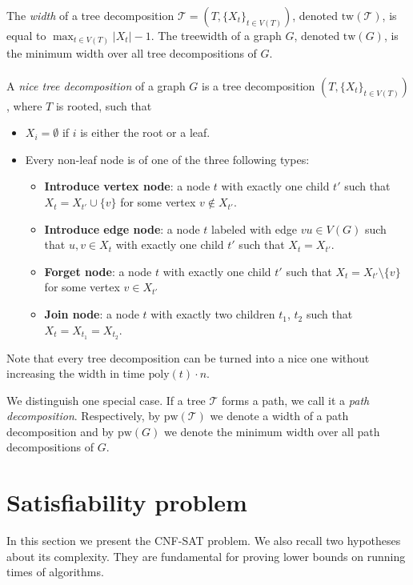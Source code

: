 \documentclass[en]{pracamgr}
\theoremstyle{definition}
\newcommand{\cnfsat}{{\sc CNF-SAT}}
\begin{document}
The \emph{width} of a tree decomposition $\mathcal{T} = (T,\{X_t\}_{t\in V(T)})$, denoted $\textrm{tw}(\mathcal{T})$, is equal to $\max_{t \in V(T)} |X_t| - 1$. The treewidth of a graph $G$, denoted $\textrm{tw}(G)$, is the minimum width over all tree decompositions of $G$.
\\\\
A \emph{nice tree decomposition} of a graph $G$ is a tree decomposition $(T, \{X_t\}_{t \in V(T)})$, where $T$ is rooted, such that
\begin{itemize}
	\item $X_i = \emptyset$ if $i$ is either the root or a leaf.
	\item Every non-leaf node is of one of the three following types:
	\begin{itemize}
		\item \textbf{Introduce vertex node}: a node $t$ with exactly one child $t'$ such that $X_t = X_{t'} \cup \{v\}$ for some vertex $v \notin X_{t'}$.
		\item \textbf{Introduce edge node}: a node $t$ labeled with edge $vu \in V(G)$ such that $u,v \in X_t$ with exactly one child $t'$ such that $X_t = X_{t'}$.
		\item \textbf{Forget node}: a node $t$ with exactly one child $t'$ such that $X_t = X_{t'} \setminus \{v\}$ for some vertex $v \in X_{t'}$
		\item \textbf{Join node}: a node $t$ with exactly two children $t_1$, $t_2$ such that $X_t = X_{t_1} = X_{t_2}$.
	\end{itemize}
\end{itemize}
Note that every tree decomposition can be turned into a nice one without increasing the width in time $\textrm{poly}(t) \cdot n$.

We distinguish one special case. If a tree $\mathcal{T}$ forms a path, we call it a \emph{path decomposition}. Respectively, by $\textrm{pw}(\mathcal{T})$ we denote a width of a path decomposition and by $\textrm{pw}(G)$ we denote the minimum width over all path decompositions of $G$.

\section{Satisfiability problem}

In this section we present the \cnfsat{} problem. We also recall two hypotheses about its complexity. They are fundamental for proving lower bounds on running times of algorithms. 
\end{document}
